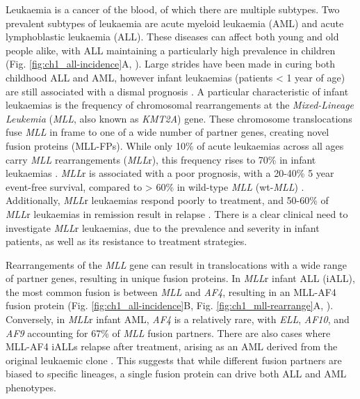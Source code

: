Leukaemia is a cancer of the blood, of which there are multiple subtypes. Two prevalent subtypes of leukaemia are acute myeloid leukaemia (AML) and acute lymphoblastic leukaemia (ALL). These diseases can affect both young and old people alike, with ALL maintaining a particularly high prevalence in children (Fig. \ref{fig:ch1_all-incidence}A, \cite{national_cancer_institute_seerexplorer_2022, meyer_mll_2018}). Large strides have been made in curing both childhood ALL and AML, however infant leukaemias (patients < 1 year of age) are still associated with a dismal prognosis \citep{rice_mll-rearranged_2020, pieters_outcome_2019}. A particular characteristic of infant leukaemias is the frequency of chromosomal rearrangements at the \textit{Mixed-Lineage Leukemia} (\textit{MLL}, also known as \textit{KMT2A}) gene. These chromosome translocations fuse \textit{MLL} in frame to one of a wide number of partner genes, creating novel fusion proteins (MLL-FPs). While only 10\% of acute leukaemias across all ages carry \textit{MLL} rearrangements (\textit{MLL}r), this frequency rises to 70\% in infant leukaemias \citep{meyer_mll_2013, mann_improved_2010, winters_mll-rearranged_2017, muntean_pathogenesis_2012}. \textit{MLL}r is associated with a poor prognosis, with a 20-40\% 5 year event-free survival, compared to > 60\% in wild-type \textit{MLL} (wt-\textit{MLL}) \citep{winters_mll-rearranged_2017, hilden_analysis_2006, tomizawa_outcome_2007}. Additionally, \textit{MLL}r leukaemias respond poorly to treatment, and 50-60\% of \textit{MLL}r leukaemias in remission result in relapse \citep{winters_mll-rearranged_2017, reaman_treatment_1999, milne_mouse_2017}. There is a clear clinical need to investigate \textit{MLL}r leukaemias, due to the prevalence and severity in infant patients, as well as its resistance to treatment strategies.

Rearrangements of the \textit{MLL} gene can result in translocations with a wide range of partner genes, resulting in unique fusion proteins. In \textit{MLL}r infant ALL (iALL), the most common fusion is between \textit{MLL} and \textit{AF4}, resulting in an MLL-AF4 fusion protein (Fig. \ref{fig:ch1_all-incidence}B, Fig. \ref{fig:ch1_mll-rearrange}A, \cite{meyer_mll_2018}). Conversely, in \textit{MLL}r infant AML, \textit{AF4} is a relatively rare, with \textit{ELL}, \textit{AF10}, and \textit{AF9} accounting for 67\% of \textit{MLL} fusion partners. There are also cases where MLL-AF4 iALLs relapse after treatment, arising as an AML derived from the original leukaemic clone \citep{dorantes-acosta_lineage_2012, gardner_acquisition_2016}. This suggests that while different fusion partners are biased to specific lineages, a single fusion protein can drive both ALL and AML phenotypes.

